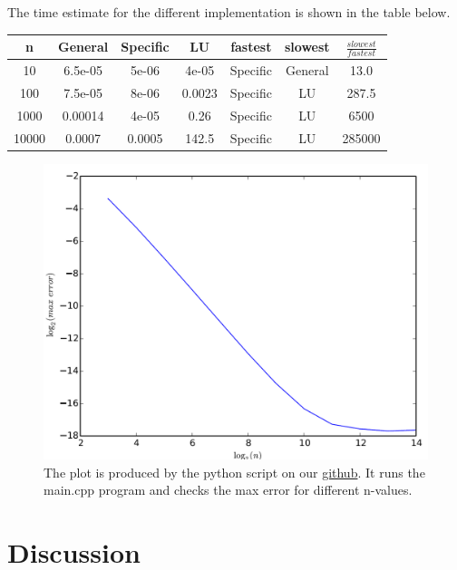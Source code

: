 \documentclass[12pt,norsk,a4paper]{article}
\begin{document}
The time estimate for the different implementation is shown in the table below. \\

	\begin{tabular}{|c|c|c|c|c|c|c|}
		\hline 
		n & General & Specific & LU & fastest & slowest & $\frac{slowest}{fastest}$\\ 
		\hline
		10 & 6.5e-05 & 5e-06 & 4e-05 & Specific & General & 13.0\\ 
		\hline 
		100 & 7.5e-05 & 8e-06 & 0.0023 & Specific & LU & 287.5\\ 
		\hline 
		1000 & 0.00014 & 4e-05 & 0.26 & Specific & LU & 6500\\ 
		\hline
		10000 & 0.0007 & 0.0005 & 142.5 & Specific & LU & 285000 \\ 
		\hline
	\end{tabular}


	\begin{figure}[H]
		\centering
		\includegraphics[width=0.7\linewidth]{bilder/error}
		\caption{The plot is produced by the python script on our \href{https://github.com/erikfsk/Project-1}{github}. It runs the main.cpp program and checks the max error for different n-values.}
		\label{fig:error}
	\end{figure}

















\section{Discussion}
\end{document}
